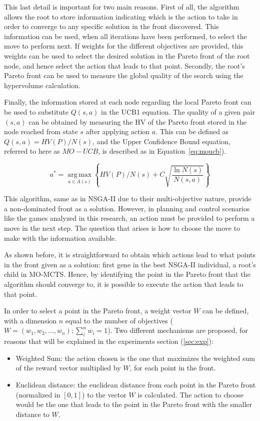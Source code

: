 \documentclass[journal]{IEEEtran}
\newcommand{\argmax}{\operatorname*{arg\,max}}
\begin{document}
This last detail is important for two main reasons. First of all, the algorithm allows the root to store information indicating which is the action to take in order to converge to any specific solution in the front discovered. This information can be used, when all iterations have been performed, to select the move to perform next. If weights for the different objectives are provided, this weights can be used to select the desired solution in the Pareto front of the root node, and hence select the action that leads to that point. Secondly, the root's Pareto front can be used to measure the global quality of the search using the hypervolume calculation.

Finally, the information stored at each node regarding the local Pareto front can be used to substitute $Q(s,a)$ in the UCB1 equation. The quality of a given pair $(s,a)$ can be obtained by measuring the HV of the Pareto front stored in the node reached from state $s$ after applying action $a$. This can be defined as  $Q(s,a) = HV(P)/N(s)$, and the Upper Confidence Bound equation, referred to here as $MO-UCB$, is described as in Equation~\ref{eq:moucb}). 

\begin{equation}	\label{eq:moucb}
a^* = \argmax_{a \in A(s)} \left\{HV(P)/N(s) + C \sqrt{\frac{ \ln N(s) }{ N(s,a) }}\right\}
\end{equation}

This algorithm, same as in NSGA-II due to their multi-objective nature, provide a non-dominated front as a solution. However, in planning and control scenarios like the games analyzed in this research, an action must be provided to perform a move in the next step. The question that arises is how to choose the move to make with the information available.

As shown before, it is straightforward to obtain which actions lead to what points in the front given as a solution: first gene in the best NSGA-II individual, a root's child in MO-MCTS. Hence, by identifying the point in the Pareto front that the algorithm should converge to, 
it is possible to execute the action that leads to that point.

In order to select a point in the Pareto front, a weight vector $W$ can be defined, with a dimension $n$ equal to the number of objectives ($W = (w_1, w_2, \dots, w_n); \sum_{i}^{n} w_i = 1$). Two different mechanisms are proposed, for reasons that will be explained in the experiments section (\ref{sec:exp}):

\begin{itemize}
\item Weighted Sum: the action chosen is the one that maximizes the weighted sum of the reward vector multiplied by $W$, for each point in the front.
\item Euclidean distance: the euclidean distance from each point in the Pareto front (normalized in $[0,1]$) to the vector $W$ is calculated. The action to choose would be the one that leads to the point in the Pareto front with the smaller distance to $W$. 
\end{itemize}
\end{document}
